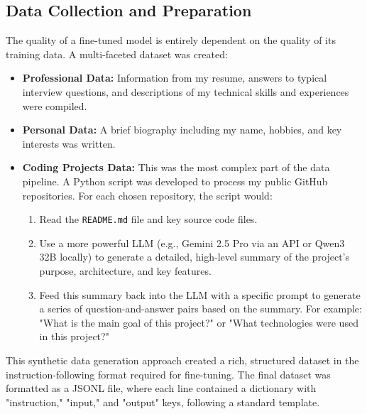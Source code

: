 \documentclass[conference]{IEEEtran}
\begin{document}
\subsection{Data Collection and Preparation}
The quality of a fine-tuned model is entirely dependent on the quality of its training data. A multi-faceted dataset was created:
\begin{itemize}
    \item \textbf{Professional Data:} Information from my resume, answers to typical interview questions, and descriptions of my technical skills and experiences were compiled.
    \item \textbf{Personal Data:} A brief biography including my name, hobbies, and key interests was written.
    \item \textbf{Coding Projects Data:} This was the most complex part of the data pipeline. A Python script was developed to process my public GitHub repositories. For each chosen repository, the script would:
    \begin{enumerate}
        \item Read the \texttt{README.md} file and key source code files.
        \item Use a more powerful LLM (e.g., Gemini 2.5 Pro via an API or Qwen3 32B locally) to generate a detailed, high-level summary of the project's purpose, architecture, and key features.
        \item Feed this summary back into the LLM with a specific prompt to generate a series of question-and-answer pairs based on the summary. For example: "What is the main goal of this project?" or "What technologies were used in this project?"
    \end{enumerate}
\end{itemize}
This synthetic data generation approach created a rich, structured dataset in the instruction-following format required for fine-tuning. The final dataset was formatted as a JSONL file, where each line contained a dictionary with "instruction," "input," and "output" keys, following a standard template.
\end{document}
